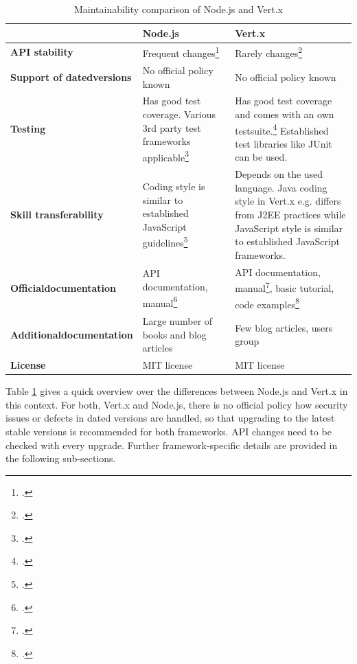 \begin{savenotes}
\begin{table}[ht]
\begin{tabular*}{\textwidth}{p{} p{} p{}}
\toprule
				& \textbf{Node.js} & \textbf{Vert.x} \\
\midrule 
\textbf{API stability}
& Frequent changes\footcite[Cf.][]{node_api_changes_2012}
& Rarely changes\footcite[Cf.][]{vertx_2012}
\\	
\textbf{Support of dated\newline versions}
& No official policy known
& No official policy known
\\
\textbf{Testing}
& Has good test coverage. Various 3rd party test frameworks applicable\footcite[Cf.][]{node_testing_2013}
& Has good test coverage and comes with an own testsuite.\footcite[Cf.][]{vertx_repository_2013} Established test libraries like JUnit can be used.
\\						  
\textbf{Skill transferability}	
& Coding style is similar to established JavaScript guidelines\footcite[Cf.][]{node_style_2012}							
& Depends on the used language. Java coding style in Vert.x e.g. differs from J2EE practices
\nomenclature{J2EE}{Java 2 Enterprise  Edition} while JavaScript style
is similar to established JavaScript frameworks.
\\
\textbf{Official\newline documentation}
& API documentation, manual\footcite[Cf.][]{node_2012}
& API documentation, manual\footcite[Cf.][]{vertx_2012}, basic tutorial, code examples\footcite[Cf.][]{Fox_2013}
\\
\textbf{Additional\newline documentation}
& Large number of books and blog articles
& Few blog articles, users group
\\
\textbf{License}			
& MIT license 			
& MIT license
 \\
\bottomrule 
\end{tabular*}
  \caption{Maintainability comparison of Node.js and Vert.x}
  \label{tbl_maintain}
\end{table}
\end{savenotes}

Table \ref{tbl_maintain} gives a quick overview over the differences between
Node.js and Vert.x in this context. For both, Vert.x and Node.js, there is no
official policy how security issues or defects in dated versions are handled, so
that upgrading to the latest stable versions is recommended for both frameworks.
API changes need to be checked with every upgrade.
Further framework-specific details are provided in the following sub-sections.\\


